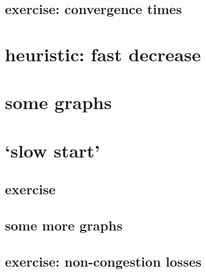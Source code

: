 \subsection{exercise: convergence times}


\section{heuristic: fast decrease}



\section{some graphs}


\section{`slow start'}


\subsection{exercise}


\subsection{some more graphs}


\subsection{exercise: non-congestion losses}






